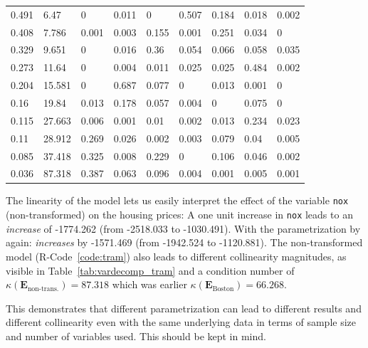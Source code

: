 \documentclass[11pt,a4paper,twoside]{book}\usepackage[]{graphicx}\usepackage[]{xcolor}
\begin{document}
\begin{table}[h]
\begin{center}
\begin{tabular}{lllllllll}
  0.491 & 6.47 & 0 & 0.011 & 0 & 0.507 & 0.184 & 0.018 & 0.002 \\ 
  0.408 & 7.786 & 0.001 & 0.003 & 0.155 & 0.001 & 0.251 & 0.034 & 0 \\ 
  0.329 & 9.651 & 0 & 0.016 & 0.36 & 0.054 & 0.066 & 0.058 & 0.035 \\ 
  0.273 & 11.64 & 0 & 0.004 & 0.011 & 0.025 & 0.025 & 0.484 & 0.002 \\ 
  0.204 & 15.581 & 0 & 0.687 & 0.077 & 0 & 0.013 & 0.001 & 0 \\ 
  0.16 & 19.84 & 0.013 & 0.178 & 0.057 & 0.004 & 0 & 0.075 & 0 \\ 
  0.115 & 27.663 & 0.006 & 0.001 & 0.01 & 0.002 & 0.013 & 0.234 & 0.023 \\ 
  0.11 & 28.912 & 0.269 & 0.026 & 0.002 & 0.003 & 0.079 & 0.04 & 0.005 \\ 
  0.085 & 37.418 & 0.325 & 0.008 & 0.229 & 0 & 0.106 & 0.046 & 0.002 \\ 
  0.036 & 87.318 & 0.387 & 0.063 & 0.096 & 0.004 & 0.001 & 0.005 & 0.001 \\ 
   \bottomrule
\end{tabular}
\endgroup

\end{center}\end{table}

The linearity of the model lets us easily interpret the effect of the variable \texttt{nox} (non-transformed) on the housing prices: A one unit increase in \texttt{nox} leads to an \textit{increase} of -1774.262 (from -2518.033 to -1030.491). With the parametrization by \cite{Harrison1978} again: \textit{increases} by -1571.469 (from -1942.524 to -1120.881). The non-transformed model (\textsf{R}-Code~\ref{code:tram}) also leads to different collinearity magnitudes, as visible in Table~\ref{tab:vardecomp_tram} and a condition number of $\kappa\left(\boldsymbol{E}_\text{non-trans.}\right)=87.318$ which was earlier $\kappa\left(\boldsymbol{E}_\text{Boston}\right)=66.268$.

This demonstrates that different parametrization can lead to different results and different collinearity even with the same underlying data in terms of sample size and number of variables used. This should be kept in mind.






\end{document}
